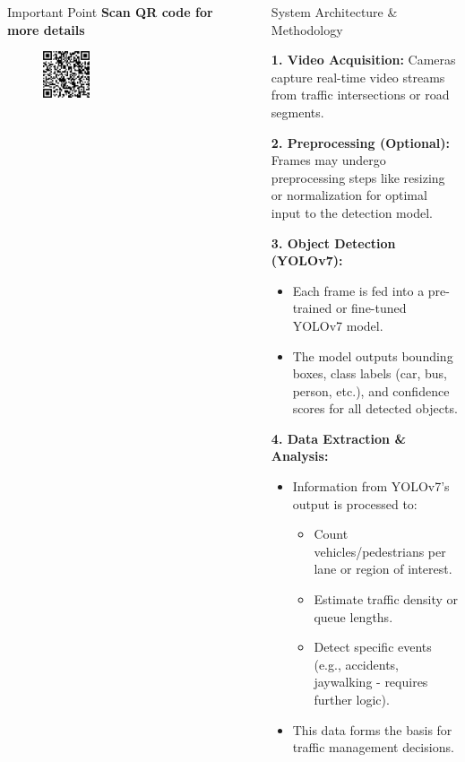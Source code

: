 \documentclass[final]{beamer}
\newlength{\sepwidth}
\newlength{\colwidth}
\newcommand{\separatorcolumn}{\begin{column}{\sepwidth}\end{column}}
\begin{document}
\begin{frame}[t]
\begin{columns}[t]
\begin{column}{\colwidth}
  \vfill

  \begin{alertblock}{Important Point}
    \centering
    \textbf{Scan QR code for more details}
    \begin{figure}[h]
        \centering
        \includegraphics[width = 0.3\textwidth]{logoss/dipqr.png}
        \label{fig:my_zero}
    \end{figure}
  \end{alertblock}







\end{column}

\separatorcolumn

\begin{column}{\colwidth}

  \begin{block}{System Architecture \& Methodology}

    \textbf{1. Video Acquisition:} Cameras capture real-time video streams from traffic intersections or road segments.

    \textbf{2. Preprocessing (Optional):} Frames may undergo preprocessing steps like resizing or normalization for optimal input to the detection model.

    \textbf{3. Object Detection (YOLOv7):}
    \begin{itemize}
      \item Each frame is fed into a pre-trained or fine-tuned YOLOv7 model.
      \item The model outputs bounding boxes, class labels (car, bus, person, etc.), and confidence scores for all detected objects.
    \end{itemize}

    \textbf{4. Data Extraction \& Analysis:}
    \begin{itemize}
      \item Information from YOLOv7's output is processed to:
          \begin{itemize}
            \item Count vehicles/pedestrians per lane or region of interest.
            \item Estimate traffic density or queue lengths.
            \item Detect specific events (e.g., accidents, jaywalking - requires further logic).
          \end{itemize}
      \item This data forms the basis for traffic management decisions.
    \end{itemize}


\end{block}
\end{column}
\end{columns}
\end{frame}
\end{document}
